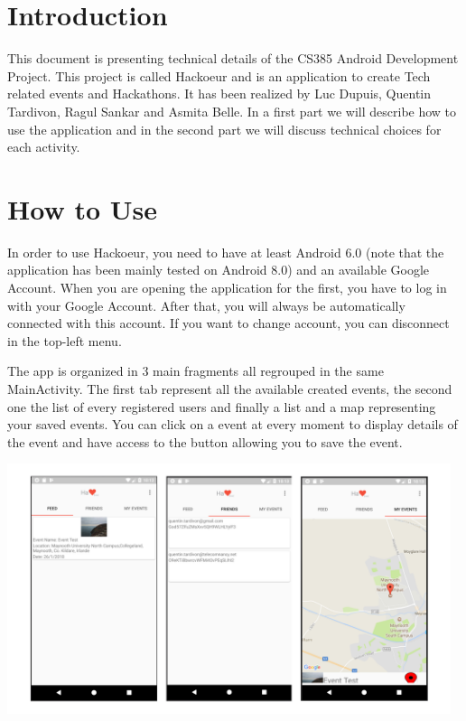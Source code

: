 \documentclass[a4paper,11pt, oneside]{book}
\author{Luc Dupuis, Quentin Tardivon, Ragul Sankar, Asmita Belle}
\date{\today}
\begin{document}
	\begin{titlepage}
		
	\end{titlepage}


	\newpage\newpage\null\thispagestyle{empty}
	\newpage
		\tableofcontents
		\thispagestyle{empty}


	\chapter{Introduction}
	\setcounter{page}{1}

	This document is presenting technical details of the CS385 Android Development
	Project. This project is called Hackoeur and is an application to create Tech related events and
	Hackathons. It has been realized by Luc Dupuis, Quentin Tardivon, Ragul Sankar and Asmita Belle.
	In a first part we will describe how to use the application and in the second part we will discuss
	technical choices for each activity.

	\chapter{How to Use}

	In order to use Hackoeur, you need to have at least Android 6.0 (note that the application has been
	mainly tested on Android 8.0) and an available Google Account. When you are opening the application for
	the first, you have to log in with your Google Account. After that, you will always be automatically
	connected with this account. If you want to change account, you can disconnect in the top-left menu.

	The app is organized in 3 main fragments all regrouped in the same MainActivity. The first tab represent
	all the available created events, the second one the list of every registered users and finally a list 
	and a map representing your saved events. You can click on a event at every moment to display details of
	the event and have access to the button allowing you to save the event. 

	\includegraphics[width=13cm]{./img/views.png}
\end{document}
